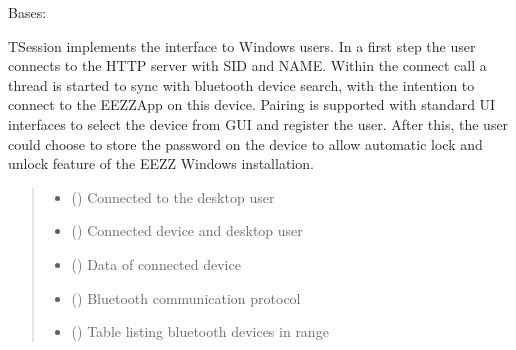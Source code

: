 \documentclass[letterpaper,10pt,english]{sphinxmanual}
\begin{document}
\begin{savenotes}\begin{fulllineitems}
\label{\detokenize{eezz:eezz.session.TSession}}
\pysigstartsignatures
{}
\pysigstopsignatures
\sphinxAtStartPar
Bases: 

\sphinxAtStartPar
TSession implements the interface to Windows users. In a first step the user connects to the HTTP server with
SID and NAME.
Within the connect call a thread is started to sync with bluetooth device search, with the intention to connect
to the EEZZ\sphinxhyphen{}App on this device.
Pairing is supported with standard UI interfaces to select the device from GUI and register the user.
After this, the user could choose to store the password on the device to allow automatic lock and unlock feature
of the EEZZ Windows installation.
\begin{quote}\begin{description}
\begin{itemize}
\item {} 
\sphinxAtStartPar
{} () \textendash{} Connected to the desktop user

\item {} 
\sphinxAtStartPar
{} () \textendash{} Connected device and desktop user

\item {} 
\sphinxAtStartPar
{} ({\hyperref[\detokenize{eezz:eezz.table.TTableRow}]{}}) \textendash{} Data of connected device

\item {} 
\sphinxAtStartPar
{} ({\hyperref[\detokenize{eezz:eezz.blueserv.TBluetoothService}]{}}) \textendash{} Bluetooth communication protocol

\item {} 
\sphinxAtStartPar
{} ({\hyperref[\detokenize{eezz:eezz.blueserv.TBluetooth}]{}}) \textendash{} Table listing bluetooth devices in range


\end{itemize}
\end{description}
\end{quote}
\end{fulllineitems}
\end{savenotes}
\end{document}
